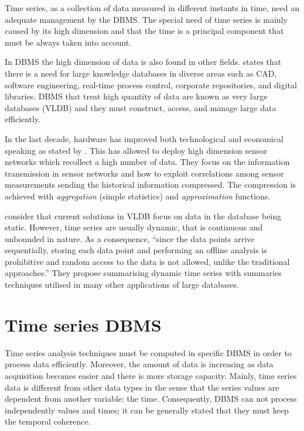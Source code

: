 Time series, as a collection of data measured in different instants in time, need an adequate management by the DBMS. The special need of time series is mainly caused by its high dimension and that the time is a principal component that must be always taken into account. 
 


In DBMS the high dimension of data is also found in other fields. \textcite{mylopoulos96} states that there is a need for large knowledge databases in diverse areas such as CAD, software engineering, real-time process control, corporate repositories, and digital libraries. DBMS that treat high quantity of data are known as very large databases (VLDB) and they must construct, access, and manage large data efficiently.

In the last decade, hardware has improved both technological and economical speaking as stated by \textcite{deligiannakis07}. This has allowed to deploy high dimension sensor networks which recollect a high number of data. They focus on the information transmission in sensor networks and how to exploit correlations among sensor measurements sending the historical information compressed. The compression is achieved with \emph{aggregation} (simple statistics) and \emph{approximation} functions. 


\textcite{ogras06}  consider that current solutions in VLDB focus on data in the database being static. However, time series are usually dynamic, that is continuous and unbounded in nature. As a consequence, ``since the data points arrive sequentially, storing each data point and performing an offline analysis is prohibitive and random access to the data is not allowed, unlike the traditional approaches.'' They propose summarising dynamic time series with summaries techniques utilised in many other applications of large databases.
       





\section{Time series DBMS}\label{sec:TSMS}

Time series analysis techniques must be computed in specific DBMS in order to process data efficiently. Moreover, the amount of data is increasing as data acquisition becomes easier and there is more storage capacity. 
Mainly, time series data is different from other data types in the sense that the series values are dependent from another variable: the time. Consequently, DBMS can not process independently values and times; it can be generally stated that they must keep the temporal coherence. 


